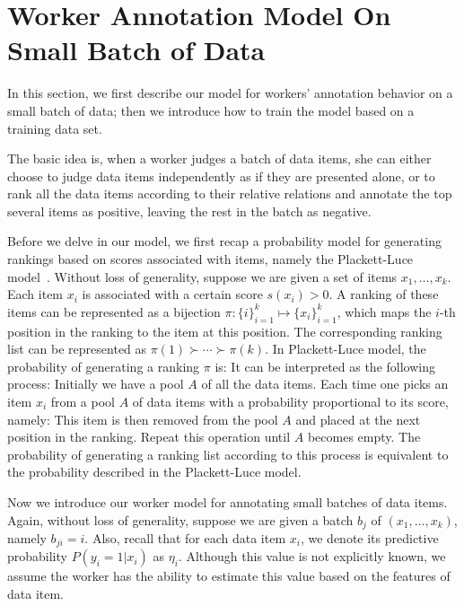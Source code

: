 \section{Worker Annotation Model On Small Batch of Data}
\label{sec:worker}

In this section, we first describe our model for workers' annotation behavior on a small batch of data;
then we introduce how to train the model based on a training data set.  

The basic idea is, when a worker judges a batch of data items, 
she can either choose to judge data items independently as if they are presented alone,
or to rank all the data items according to their relative relations 
and annotate the top several items as positive, leaving the rest in the batch as negative.  


Before we delve in our model, we first recap a probability model for generating rankings 
based on scores associated with items, namely the Plackett-Luce model~\cite{luce:2005, plackett:1975}.  
Without loss of generality, suppose we are given a set of items $x_1, \ldots, x_k$.
Each item $x_i$ is associated with a certain score $s(x_i) > 0$.  
A ranking of these items can be represented as a bijection $\pi : \{i\}_{i = 1}^k \mapsto \{x_i\}_{i = 1}^k$, 
which maps the $i$-th position in the ranking to the item at this position.  
The corresponding ranking list can be represented as 
$\pi(1) \succ \cdots \succ \pi(k)$. 
In Plackett-Luce model, the probability of generating a ranking $\pi$ is:
%
It can be interpreted as the following process:
Initially we have a pool $A$ of all the data items.  
Each time one picks an item $x_i$ from a pool $A$ of data items with a probability proportional to its score, namely:
This item is then removed from the pool $A$ and placed at the next position in the ranking.  
Repeat this operation until $A$ becomes empty.  
The probability of generating a ranking list according to this process is equivalent to the probability described in the Plackett-Luce model.  


Now we introduce our worker model for annotating small batches of data items.  
Again, without loss of generality, suppose we are given a batch $b_j$ of $(x_1, \ldots, x_k)$, namely $b_{ji} = i$.  
Also, recall that for each data item $x_i$, we denote its predictive probability $P(y_i = 1 | x_i)$ as $\eta_i$.  
Although this value is not explicitly known, 
we assume the worker has the ability to estimate this value based on the features of data item.  

